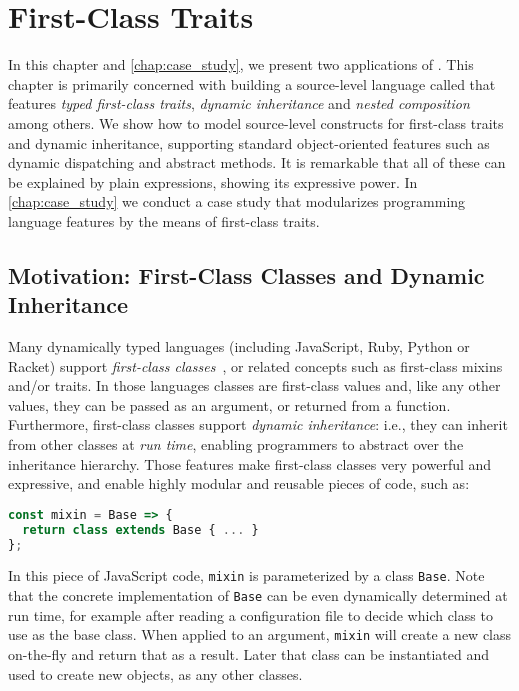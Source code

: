 \chapter{First-Class Traits}
\label{chap:traits}


In this chapter and \cref{chap:case_study}, we present two applications of
\fnamee. This chapter is primarily concerned with building a source-level
language called \sedel that features \emph{typed first-class traits},
\emph{dynamic inheritance} and \emph{nested composition} among others. We show
how to model source-level constructs for first-class traits and dynamic
inheritance, supporting standard object-oriented features such as dynamic
dispatching and abstract methods. It is remarkable that all of these can be
explained by plain \fnamee expressions, showing its expressive power. In
\cref{chap:case_study} we conduct a case study that modularizes programming
language features by the means of first-class traits.



\section{Motivation: First-Class Classes and Dynamic Inheritance}

Many dynamically typed languages (including JavaScript, Ruby, Python
or Racket) support \emph{first-class classes}~\citep{DBLP:conf/aplas/FlattFF06}, or related concepts
such as first-class mixins and/or traits. In those languages classes
are first-class values and, like any other values, they can be
passed as an argument, or returned from a function. Furthermore,
first-class classes support \emph{dynamic inheritance}: i.e., they
can inherit from other classes at \emph{run time}, enabling
programmers to abstract over the inheritance hierarchy.
Those features make first-class classes very powerful and expressive,
and enable highly modular and reusable pieces of code, such as:
\begin{lstlisting}[language=JavaScript]
const mixin = Base => {
  return class extends Base { ... }
};
\end{lstlisting}
In this piece of JavaScript code, \lstinline{mixin} is
parameterized by a class \lstinline{Base}. Note that the concrete
implementation of \lstinline{Base} can be
even dynamically determined at run time, for example
after reading a configuration file to decide which
class to use as the base class.  When applied to an argument,
\lstinline{mixin} will create a new class on-the-fly and return that
as a result. Later that class can be instantiated and used to create
new objects, as any other classes.

